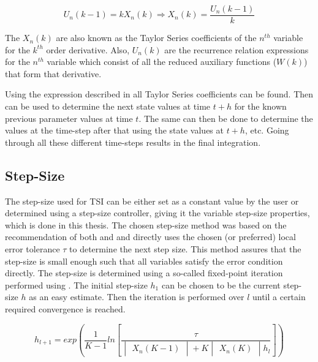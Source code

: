 \begin{equation} \label{eq:def_u}
U_{n}\left(k-1\right)=kX_{n}\left(k\right)\Rightarrow X_{n}\left(k\right)=\dfrac{U_{n}\left(k-1\right)}{k}
\end{equation}


\noindent
The $X_{n}\left(k\right)$ are also known as the Taylor Series coefficients of the $n^{th}$ variable for the $k^{th}$ order derivative. Also, $U_{n}\left(k\right)$ are the recurrence relation expressions for the $n^{th}$ variable which consist of all the reduced auxiliary functions ($W\left(k\right)$) that form that derivative. 

\noindent
Using the expression described in  all Taylor Series coefficients can be found. Then  can be used to determine the next state values at time $t+h$ for the known previous parameter values at time $t$. The same can then be done to determine the values at the time-step after that using the state values at $t+h$, etc. Going through all these different time-steps results in the final integration. 

\subsection{Step-Size}
\label{subsec:stepSizeTsi}
The step-size used for \ac{TSI} can be either set as a constant value by the user or determined using a step-size controller, giving it the variable step-size properties, which is done in this thesis. The chosen step-size method was based on the recommendation of both \cite{scott2008high} and \cite{bergsma2015application} and directly uses the chosen (or preferred) local error tolerance $\tau$ to determine the next step size. This method assures that the step-size is small enough such that all variables satisfy the error condition directly. The step-size is determined using a so-called fixed-point iteration performed using . The initial step-size $h_{1}$ can be chosen to be the current step-size $h$ as an easy estimate. Then the iteration is performed over $l$ until a certain required convergence is reached.



\begin{equation} \label{eq:fix_point_it}
h_{l+1}=exp\left(\dfrac{1}{K-1}ln\left[\dfrac{\tau}{\begin{vmatrix}
X_{n}\left(K-1\right)
\end{vmatrix}+K\begin{vmatrix}
X_{n}\left(K\right)
\end{vmatrix}h_{l}}\right]\right)
\end{equation}


